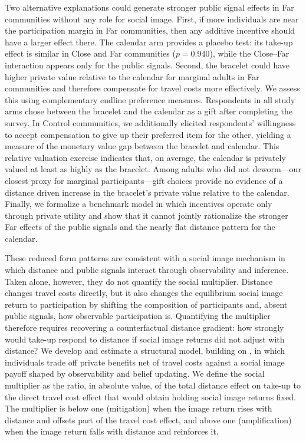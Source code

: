 \documentclass[12pt,a4paper]{article}
\begin{document}
Two alternative explanations could generate stronger public signal effects in Far communities without any role for social image. First, if more individuals are near the participation margin in Far communities, then any additive incentive should have a larger effect there. The calendar arm provides a placebo test: its take-up effect is similar in Close and Far communities (\(p=0.940\)), while the Close--Far interaction appears only for the public signals. Second, the bracelet could have higher private value relative to the calendar for marginal adults in Far communities and therefore compensate for travel costs more effectively. We assess this using complementary endline preference measures. Respondents in all study arms chose between the bracelet and the calendar as a gift after completing the survey. In Control communities, we additionally elicited respondents' willingness to accept compensation to give up their preferred item for the other, yielding a measure of the monetary value gap between the bracelet and calendar. This relative valuation exercise indicates that, on average, the calendar is privately valued at least as highly as the bracelet. Among adults who did not deworm---our closest proxy for marginal participants---gift choices provide no evidence of a distance driven increase in the bracelet's private value relative to the calendar. Finally, we formalize a benchmark model in which incentives operate only through private utility and show that it cannot jointly rationalize the stronger Far effects of the public signals and the nearly flat distance pattern for the calendar.

These reduced form patterns are consistent with a social image mechanism in which distance and public signals interact through observability and inference. Taken alone, however, they do not quantify the social multiplier. Distance changes travel costs directly, but it also changes the equilibrium social image return to participation by shifting the composition of participants and, absent public signals, how observable participation is. Quantifying the multiplier therefore requires recovering a counterfactual distance gradient: how strongly would take-up respond to distance if social image returns did not adjust with distance? We develop and estimate a structural model, building on \citet{Benabou_laws_2011}, in which individuals trade off private benefits net of travel costs against a social image payoff shaped by observability and belief updating. We define the social multiplier as the ratio, in absolute value, of the total distance effect on take-up to the direct travel cost effect that would obtain holding social image returns fixed. The multiplier is below one (mitigation) when the image return rises with distance and offsets part of the travel cost effect, and above one (amplification) when the image return falls with distance and reinforces it.
\end{document}
